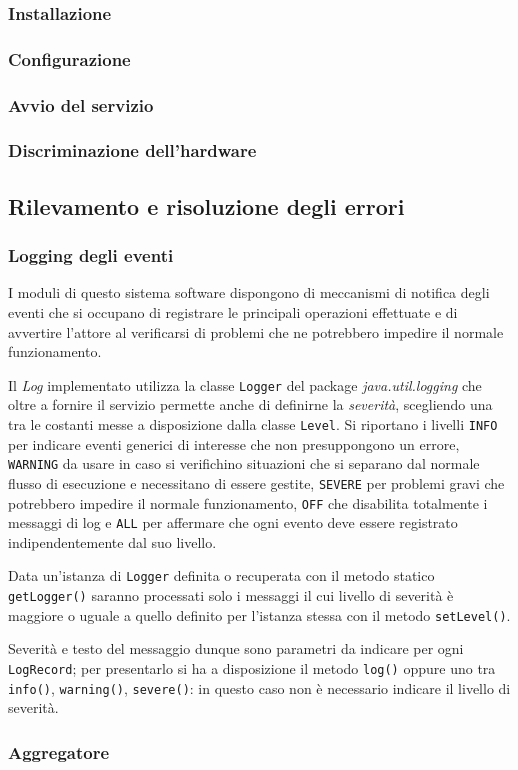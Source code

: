 \subsubsection{Installazione}
\subsubsection{Configurazione}
\subsubsection{Avvio del servizio}
\subsubsection{Discriminazione dell'hardware}

\subsection{Rilevamento e risoluzione degli errori}
\subsubsection{Logging degli eventi}
I moduli di questo sistema software dispongono di meccanismi di notifica degli
eventi che si occupano di registrare le principali operazioni effettuate e di
avvertire l'attore al verificarsi di problemi che ne potrebbero impedire il
normale funzionamento.

Il \textit{Log} implementato utilizza la classe \texttt{Logger} del package
\textit{java.util.logging} \cite{jianlog} che oltre a fornire il servizio
permette anche di definirne la \textit{severità}, scegliendo
una tra le costanti messe a disposizione dalla classe \texttt{Level}. Si riportano
\cite{jdoclevel} i livelli \texttt{INFO} per indicare eventi generici di
interesse che non presuppongono un errore, \texttt{WARNING} da usare in caso si verifichino
situazioni che si separano dal normale flusso di esecuzione e necessitano di
essere gestite, \texttt{SEVERE} per problemi gravi che potrebbero impedire il
normale funzionamento, \texttt{OFF} che disabilita totalmente i messaggi di log
e \texttt{ALL} per affermare che ogni evento deve essere registrato
indipendentemente dal suo livello.

Data un'istanza di \texttt{Logger} definita o recuperata con il metodo statico
\texttt{getLogger()} saranno processati solo i messaggi il cui livello di
severità è maggiore o uguale a quello definito per l'istanza stessa con il
metodo \texttt{setLevel()}.

Severità e testo del messaggio dunque sono parametri da indicare per ogni
\texttt{LogRecord}; per presentarlo si ha a disposizione il metodo
\texttt{log()} oppure uno tra \texttt{info()}, \texttt{warning()},
\texttt{severe()}: in questo caso non è necessario indicare il livello di
severità.
\subsubsection{Aggregatore}
